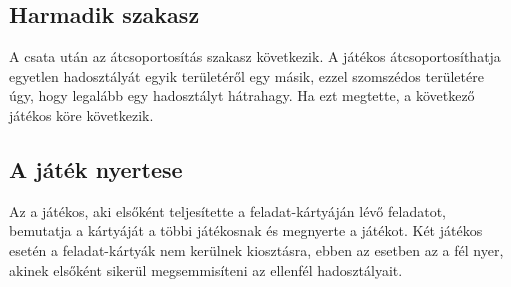 \subsection*{Harmadik szakasz}

A csata után az átcsoportosítás szakasz következik.
A játékos átcsoportosíthatja egyetlen hadosztályát egyik területéről egy másik, ezzel szomszédos területére úgy, hogy legalább egy hadosztályt hátrahagy.
Ha ezt megtette, a következő játékos köre következik.

\subsection*{A játék nyertese} 

Az a játékos, aki elsőként teljesítette a feladat-kártyáján lévő feladatot, bemutatja a kártyáját a többi játékosnak és megnyerte a játékot.
Két játékos esetén a feladat-kártyák nem kerülnek kiosztásra, ebben az esetben az a fél nyer, akinek elsőként sikerül megsemmisíteni az ellenfél hadosztályait.